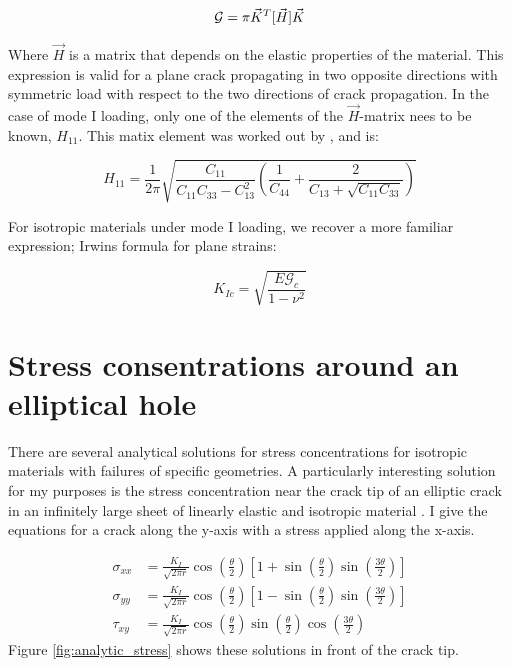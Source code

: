 \begin{equation}
	\mathbf{\mathcal{G}} = \pi \vec{K}^T [\vec{H}] \vec{K} 
\end{equation}


Where $\vec{H}$ is a matrix that depends on the elastic properties of the material. This expression is valid for a plane crack propagating in two opposite directions with symmetric load with respect to the two directions of crack propagation. In the case of mode I loading, only one of the elements of the $\vec{H}$-matrix nees to be known, $H_{11}$. This matix element was worked out by \citet{Laubie2014}, and is:

\begin{equation}
	H_{11} = \frac{1}{2\pi} \sqrt{\frac{C_{11}}{C_{11}C_{33}-C^2_{13}}\left( \frac{1}{C_{44}} + \frac{2}{C_{13} + \sqrt{C_{11} C_{33}}}\right)}
\end{equation}

For isotropic materials under mode I loading, we recover a more familiar expression; Irwins formula for plane strains:

\begin{equation}
	K_{Ic} = \sqrt{\frac{E\mathcal{G}_{c}}{1-\nu^2}}
	\label{eq:energy_release_to_stress_intensity_isotropic}
\end{equation}



\section{Stress consentrations around an elliptical hole}
There are several analytical solutions for stress concentrations for isotropic materials with failures of specific geometries. A particularly interesting solution for my purposes is the stress concentration near the crack tip of an elliptic crack in an infinitely large sheet of linearly elastic and isotropic material \cite{Anderson2005}. I give the equations for a crack along the y-axis with a stress applied along the x-axis.

\begin{align}
	\sigma_{xx} & =  \frac{K_I}{\sqrt{2\pi r}} \cos\left(\frac{\theta}{2}\right) \left[ 1+\sin\left(\frac{\theta}{2} \right)\sin\left( \frac{3\theta}{2}\right)\right]\\
	\sigma_{yy} & =  \frac{K_I}{\sqrt{2\pi r}} \cos\left(\frac{\theta}{2}\right) \left[ 1-\sin\left(\frac{\theta}{2} \right)\sin\left( \frac{3\theta}{2}\right)\right]\\	
	\tau_{xy} & =  \frac{K_I}{\sqrt{2\pi r}} \cos\left(\frac{\theta}{2}\right)\sin\left(\frac{\theta}{2} \right)\cos\left( \frac{3\theta}{2}\right)
\end{align}
Figure \ref{fig:analytic_stress} shows these solutions in front of the crack tip.

